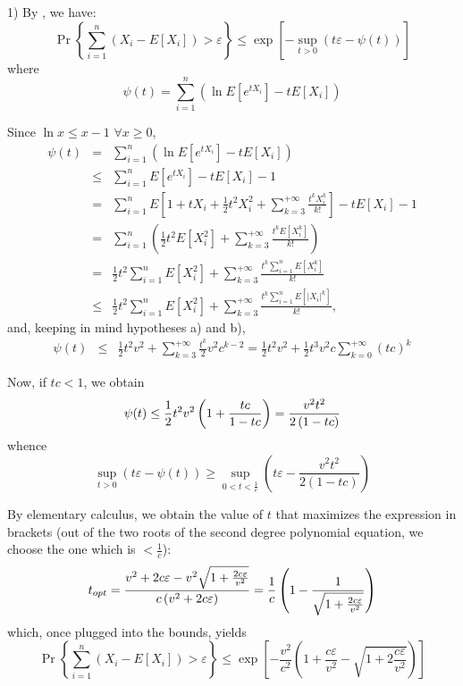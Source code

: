 \documentclass[12pt]{article}
\begin{document}
1) By , we have:
\[
\Pr\left\{ \sum_{i=1}^{n}\left( X_{i}-E[X_{i}]\right) >\varepsilon \right\}
\leq \exp \left[ -\sup_{t > 0}\left( t\varepsilon -\psi (t)\right) \right] 
\]
where
\[
\psi (t)=\sum_{i=1}^{n}\left( \ln E\left[ e^{tX_{i}}\right] -tE\left[ X_{i}%
\right] \right) 
\]

Since $\ln x\leq x-1$ $\forall x\geq 0$,
\begin{eqnarray*}
\psi (t) &=&\sum_{i=1}^{n}\left( \ln E\left[ e^{tX_{i}}\right] -tE\left[
X_{i}\right] \right) \\
&\leq &\sum_{i=1}^{n}E\left[ e^{tX_{i}}\right] -tE\left[ X_{i}\right] -1 \\
&=&\sum_{i=1}^{n}E\left[ 1+tX_{i}+\frac{1}{2}t^{2}X_{i}^{2}+\sum_{k=3}^{+%
\infty }\frac{t^{k}X_{i}^{k}}{k!}\right] -tE\left[ X_{i}\right] -1 \\
&=&\sum_{i=1}^{n}\left( \frac{1}{2}t^{2}E\left[ X_{i}^{2}\right]
+\sum_{k=3}^{+\infty }\frac{t^{k}E\left[ X_{i}^{k}\right] }{k!}\right) \\
&=&\frac{1}{2}t^{2}\sum_{i=1}^{n}E\left[ X_{i}^{2}\right] +\sum_{k=3}^{+%
\infty }\frac{t^{k}\sum_{i=1}^{n}E\left[ X_{i}^{k}\right] }{k!} \\
&\leq &\frac{1}{2}t^{2}\sum_{i=1}^{n}E\left[ X_{i}^{2}\right]
+\sum_{k=3}^{+\infty }\frac{t^{k}\sum_{i=1}^{n}E\left[ \left\vert
X_{i}\right\vert ^{k}\right] }{k!},
\end{eqnarray*}
and, keeping in mind hypotheses a) and b),
\begin{eqnarray*}
\psi (t) &\leq &\frac{1}{2}t^{2}v^2+\sum_{k=3}^{+\infty }\frac{t^{k}}{2}%
v^2c^{k-2}=\frac{1}{2}t^{2}v^2+\frac{1}{2}t^{3}v^2c\sum_{k=0}^{+\infty }\left( tc\right)^{k}
\end{eqnarray*}

Now, if $tc<1$, we obtain
\[
\psi (t)\leq \frac{1}{2}t^{2}v^2\left( 1+\frac{tc}{1-tc}\right) =\frac{v^2t^{2}}{%
2\left( 1-tc\right) } 
\]
whence
\[
\sup_{t > 0}\left( t\varepsilon -\psi (t)\right) \geq \sup_{0 < t < 
\frac{1}{c}}\left( t\varepsilon -\frac{v^2t^{2}}{2\left( 1-tc\right) }\right) 
\]

By elementary calculus, we obtain the value of $t$ that maximizes the
expression in brackets (out of the two roots of the second degree polynomial equation, we choose the one which is $<\frac{1}{c}$):
\[
t_{opt}=\frac{v^2+2c\varepsilon -v^2\sqrt{1+\frac{2c\varepsilon }{v^2}}}{c\left(
v^2+2c\varepsilon \right) }=\frac{1}{c}\left( 1-\frac{1}{\sqrt{1+\frac{%
2c\varepsilon }{v^2}}}\right) 
\]
which, once plugged into the bounds, yields
\[
\Pr\left\{ \sum_{i=1}^{n}\left( X_{i}-E[X_{i}]\right) >\varepsilon \right\}
\leq \exp \left[ -\frac{v^2}{c^{2}}\left( 1+\frac{c\varepsilon }{v^2}-\sqrt{1+2
\frac{c\varepsilon }{v^2}}\right) \right] 
\]
\end{document}
